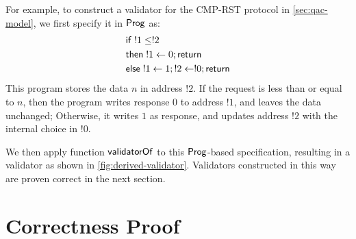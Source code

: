 For example, to construct a validator for the CMP-RST protocol in
\autoref{sec:qac-model}, we first specify it in $\mathsf{Prog}$ as:
\begin{align*}
  &\mathsf{if}\;!1\le!2\\
  &\mathsf{then}\;!1\gets0;\mathsf{return}\\
  &\mathsf{else}\;!1\gets1;!2\gets!0;\mathsf{return}
\end{align*}
This program stores the data $n$ in address $!2$.  If the request is less than
or equal to $n$, then the program writes response $0$ to address $!1$, and
leaves the data unchanged; Otherwise, it writes $1$ as response, and updates
address $!2$ with the internal choice in $!0$.

We then apply function $\mathsf{validatorOf}$ to this $\mathsf{Prog}$-based specification,
resulting in a validator as shown in \autoref{fig:derived-validator}.
Validators constructed in this way are proven correct in the next
section.

\section{Correctness Proof}
\label{sec:proof}

